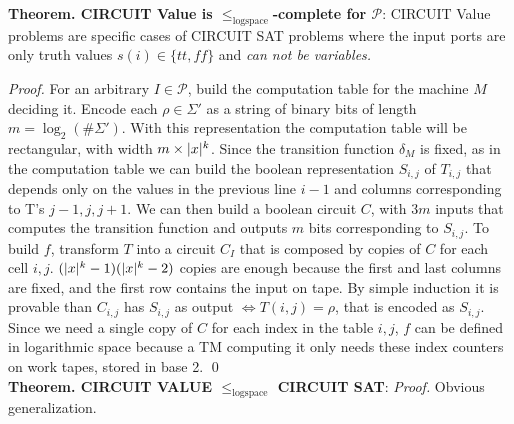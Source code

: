 \documentclass[10pt,landscape]{article}
\renewcommand{\P}{\mathcal{P}}
\DeclarePairedDelimiter\abs{\lvert}{\rvert}
\newcommand{\red}[1]{\leqslant_{#1}}
\renewcommand{\iff}{\Leftrightarrow}
\theoremstyle{plain}%
\theoremstyle{definition}
\theoremstyle{remark}
\begin{document}
\begin{multicols}{4}
\textbf{Theorem. CIRCUIT Value is $\red{\text{logspace}}$-complete for $\P$}:
CIRCUIT Value problems are specific cases of CIRCUIT SAT problems where the input
ports are only truth values $s(i) \in \{tt, ff\}$ and \textit{can not be variables.}

\textit{Proof.} For an arbitrary $I \in \P$, build the computation table for the machine $M$ deciding it.
Encode each $\rho \in \Sigma'$ as a string of binary bits of length $m = \log_2(\#\Sigma')$.
With this representation the computation table will be rectangular, with width $m \times \abs{x}^k$. 
Since the transition function $\delta_M$ is fixed, as in the computation table we can build 
the boolean representation $S_{i,j}$ of $T_{i,j}$ that depends only on the values in the previous line $i-1$ and columns 
corresponding to T's $j-1,j,j+1$.
We can then build a boolean circuit $C$, with $3m$ inputs that computes the transition function and
outputs $m$ bits corresponding to $S_{i,j}$. To build $f$, transform $T$ into a circuit $C_I$ that 
is composed by copies of $C$ for each cell $i,j$. $(\abs{x}^k - 1)(\abs{x}^k - 2)$ copies are enough because 
the first and last columns are fixed, and the first row contains the input on tape.
By simple induction it is provable than $C_{i,j}$ has $S_{i,j}$ as output $\iff T(i,j) = \rho$, that is 
encoded as $S_{i,j}$. Since we need a single copy of $C$ for each index in the table $i,j$, $f$ can be defined
in logarithmic space because a TM computing it only needs these index counters on work tapes, stored in
base 2. \qed \\[.2cm]

\textbf{Theorem. CIRCUIT VALUE $\red{\text{logspace}}$ CIRCUIT SAT}: \textit{Proof.} Obvious generalization.

\end{multicols}
\end{document}
